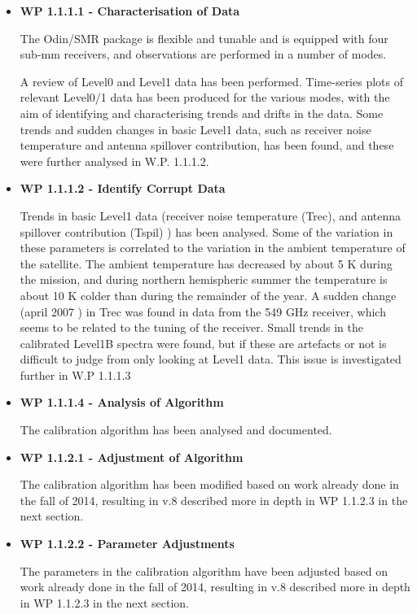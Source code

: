 \begin{itemize}

\item{\bf WP 1.1.1.1 - Characterisation of Data}

The Odin/SMR package is flexible and tunable and is equipped 
with four sub-mm receivers, and observations are performed
in a number of modes.

A review of Level0 and Level1 data has been performed.
Time-series plots of relevant Level0/1 data has been produced
for the various modes, with the aim of identifying and characterising 
trends and drifts in the data.
Some trends and sudden changes in basic Level1 data,
such as receiver noise temperature and antenna spillover 
contribution, has been found, and these were further analysed in W.P. 1.1.1.2.

\item{\bf WP 1.1.1.2 - Identify Corrupt Data}

Trends in basic Level1 data (receiver noise temperature (Trec),
and antenna spillover contribution (Tspil) ) has been analysed.
Some of the variation in these parameters is correlated to the
variation in the ambient temperature of the satellite.
The ambient temperature has decreased by about
5 K during the mission, and during northern hemispheric summer
the temperature is about 10 K colder than during the remainder of the year. 
A sudden change (april 2007 ) in Trec was found in data from
the 549 GHz receiver, which seems to be related to the tuning
of the receiver.
Small trends in the calibrated Level1B spectra were found,
but if these are artefacts or not is difficult 
to judge from only looking at Level1 data. 
This issue is investigated further in W.P 1.1.1.3 

\item{\bf WP 1.1.1.4 - Analysis of Algorithm }

The calibration algorithm has been analysed and documented.

\item{\bf WP 1.1.2.1 - Adjustment of Algorithm}

The calibration algorithm has been modified based on work already done in the fall of 2014, resulting in v.8 described more in depth in WP 1.1.2.3 in the next section.

\item{\bf WP 1.1.2.2 - Parameter Adjustments}

The parameters in the calibration algorithm have been adjusted based on work already done in the fall of 2014, resulting in v.8 described more in depth in WP 1.1.2.3 in the next section.


\end{itemize}
